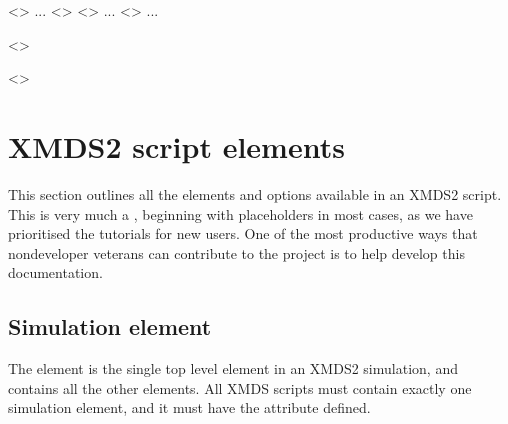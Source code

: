 \documentclass[letterpaper,10pt,english]{sphinxmanual}
\begin{document}
\begin{sphinxalltt}
    \textless{}{\hyperref[\detokenize{reference_elements:samplinggroupelement}]{}}\textgreater{} ... \textless{}{\hyperref[\detokenize{reference_elements:samplinggroupelement}]{}}\textgreater{}
    \textless{}{\hyperref[\detokenize{reference_elements:samplinggroupelement}]{}}\textgreater{} ... \textless{}{\hyperref[\detokenize{reference_elements:samplinggroupelement}]{}}\textgreater{}
    ...

  \textless{}{\hyperref[\detokenize{reference_elements:outputelement}]{}}\textgreater{}

\textless{}{\hyperref[\detokenize{reference_elements:simulationelement}]{}}\textgreater{}
\end{sphinxalltt}

\ignorespaces 

\section{XMDS2 script elements}
\label{\detokenize{reference_elements:xmds2-script-elements}}\label{\detokenize{reference_elements:referenceelements}}\label{\detokenize{reference_elements:index-0}}\label{\detokenize{reference_elements::doc}}
\sphinxAtStartPar
This section outlines all the elements and options available in an XMDS2 script.  This is very much a , beginning with placeholders in most cases, as we have prioritised the tutorials for new users.  One of the most productive ways that non\sphinxhyphen{}developer veterans can contribute to the project is to help develop this documentation.

\ignorespaces 

\subsection{Simulation element}
\label{\detokenize{reference_elements:simulation-element}}\label{\detokenize{reference_elements:simulationelement}}\label{\detokenize{reference_elements:index-1}}
\sphinxAtStartPar
The  element is the single top level element in an XMDS2 simulation, and contains all the other elements.  All XMDS scripts must contain exactly one simulation element, and it must have the  attribute defined.
\end{document}
